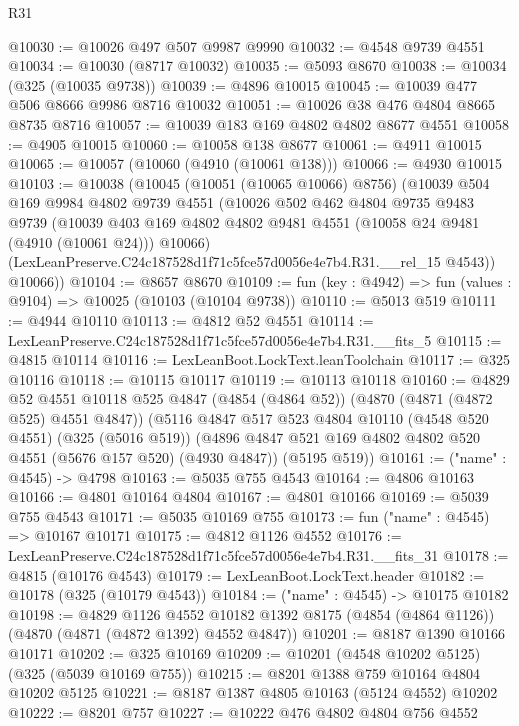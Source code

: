 \begin{lexlean}{R31}
\begin{coremodule}
@10030 := @10026 @497 @507 @9987 @9990
@10032 := @4548 @9739 @4551
@10034 := @10030 (@8717 @10032)
@10035 := @5093 @8670
@10038 := @10034 (@325 (@10035 @9738))
@10039 := @4896 @10015
@10045 := @10039 @477 @506 @8666 @9986 @8716 @10032
@10051 := @10026 @38 @476 @4804 @8665 @8735 @8716
@10057 := @10039 @183 @169 @4802 @4802 @8677 @4551
@10058 := @4905 @10015
@10060 := @10058 @138 @8677
@10061 := @4911 @10015
@10065 := @10057 (@10060 (@4910 (@10061 @138)))
@10066 := @4930 @10015
@10103 := @10038
    (@10045
      (@10051 (@10065 @10066) @8756)
      (@10039
        @504
        @169
        @9984
        @4802
        @9739
        @4551
        (@10026
          @502
          @462
          @4804
          @9735
          @9483
          @9739
          (@10039 @403 @169 @4802 @4802 @9481 @4551 (@10058 @24 @9481 (@4910 (@10061 @24))) @10066)
          (LexLeanPreserve.C24c187528d1f71c5fce57d0056e4e7b4.R31.__rel_15 @4543))
        @10066))
@10104 := @8657 @8670
@10109 := fun (key : @4942) => fun (values : @9104) => @10025 (@10103 (@10104 @9738))
@10110 := @5013 @519
@10111 := @4944 @10110
@10113 := @4812 @52 @4551
@10114 := LexLeanPreserve.C24c187528d1f71c5fce57d0056e4e7b4.R31.__fits_5
@10115 := @4815 @10114
@10116 := LexLeanBoot.LockText.leanToolchain
@10117 := @325 @10116
@10118 := @10115 @10117
@10119 := @10113 @10118
@10160 := @4829
    @52
    @4551
    @10118
    @525
    @4847
    (@4854 (@4864 @52))
    (@4870 (@4871 (@4872 @525) @4551 @4847))
    (@5116
      @4847
      @517
      @523
      @4804
      @10110
      (@4548 @520 @4551)
      (@325 (@5016 @519))
      (@4896 @4847 @521 @169 @4802 @4802 @520 @4551 (@5676 @157 @520) (@4930 @4847))
      (@5195 @519))
@10161 := ("name" : @4545) -> @4798
@10163 := @5035 @755 @4543
@10164 := @4806 @10163
@10166 := @4801 @10164 @4804
@10167 := @4801 @10166
@10169 := @5039 @755 @4543
@10171 := @5035 @10169 @755
@10173 := fun ("name" : @4545) => @10167 @10171
@10175 := @4812 @1126 @4552
@10176 := LexLeanPreserve.C24c187528d1f71c5fce57d0056e4e7b4.R31.__fits_31
@10178 := @4815 (@10176 @4543)
@10179 := LexLeanBoot.LockText.header
@10182 := @10178 (@325 (@10179 @4543))
@10184 := ("name" : @4545) -> @10175 @10182
@10198 := @4829
    @1126
    @4552
    @10182
    @1392
    @8175
    (@4854 (@4864 @1126))
    (@4870 (@4871 (@4872 @1392) @4552 @4847))
@10201 := @8187 @1390 @10166 @10171
@10202 := @325 @10169
@10209 := @10201 (@4548 @10202 @5125) (@325 (@5039 @10169 @755))
@10215 := @8201 @1388 @759 @10164 @4804 @10202 @5125
@10221 := @8187 @1387 @4805 @10163 (@5124 @4552) @10202
@10222 := @8201 @757
@10227 := @10222 @476 @4802 @4804 @756 @4552

\end{coremodule}
\end{lexlean}
